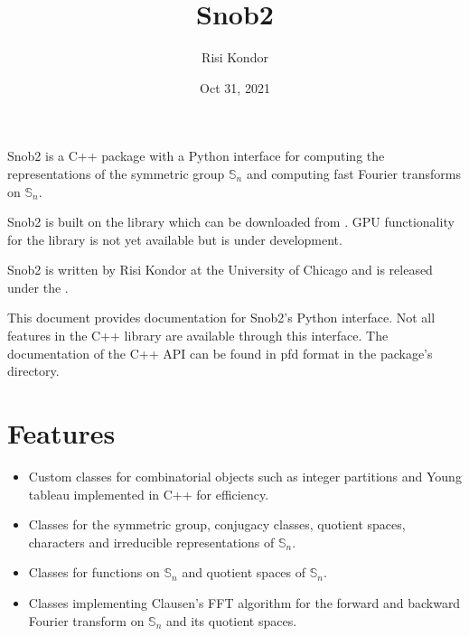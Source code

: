 \documentclass[letterpaper,10pt,english]{sphinxmanual}
\title{Snob2}
\date{Oct 31, 2021}
\author{Risi Kondor}
\begin{document}
\pagestyle{empty}
\sphinxmaketitle
\pagestyle{plain}
\sphinxtableofcontents
\pagestyle{normal}
\label{\detokenize{index::doc}}


\begin{DUlineblock}{0em}
\item[] 
\end{DUlineblock}

\sphinxAtStartPar
Snob2 is a C++ package with a Python interface
for computing the representations of the symmetric group \(\mathbb{S}_n\) and
computing fast Fourier transforms on \(\mathbb{S}_n\).

\sphinxAtStartPar
Snob2 is built on the  library which can be downloaded from .
GPU functionality for the library is not yet available but is under development.

\sphinxAtStartPar
Snob2 is written by Risi Kondor at the University of Chicago and is released under the
.

\sphinxAtStartPar
This document provides documentation for Snob2’s Python interface. Not all features in the C++ library
are available through this interface. The documentation of the C++ API can be found in pfd format
in the package’s  directory.


\chapter{Features}
\label{\detokenize{index:features}}\begin{itemize}
\item {} 
\sphinxAtStartPar
Custom classes for combinatorial objects such as integer partitions and Young tableau implemented in C++
for efficiency.

\item {} 
\sphinxAtStartPar
Classes for the symmetric group, conjugacy classes, quotient spaces,
characters and irreducible representations of \(\mathbb{S}_n\).

\item {} 
\sphinxAtStartPar
Classes for functions on \(\mathbb{S}_n\) and quotient spaces of \(\mathbb{S}_n\).

\item {} 
\sphinxAtStartPar
Classes implementing Clausen’s FFT algorithm for the forward and backward Fourier transform on
\(\mathbb{S}_n\) and its quotient spaces.

\end{itemize}
\end{document}
